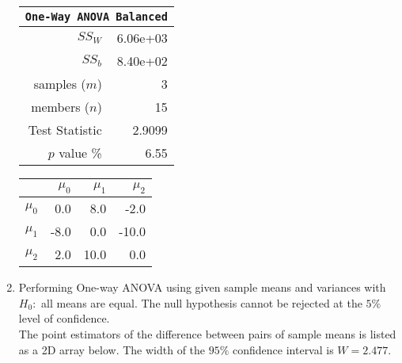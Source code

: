 \begin{enumerate}
	\begin{table}[H]
		\centering
		\begin{minipage}{0.4\textwidth}
			\centering
			\begin{tabular}{@{}rr@{}}
				\toprule
				\multicolumn{2}{c}{\texttt{One-Way ANOVA Balanced}} \\
				\midrule
				$SS_W$         &               6.06e+03 \\
				$SS_b$         &               8.40e+02 \\
				samples ($m$)  &                      3 \\
				members ($n$)  &                     15 \\
				Test Statistic &                 2.9099 \\
				$p$ value \%   &                   6.55 \\
				\bottomrule
			\end{tabular}
		\end{minipage}
		\begin{minipage}{0.4\textwidth}
			\centering
			\begin{tabular}{lrrr}
				\toprule
				{} &  $\mu_0$ &  $\mu_1$ &  $\mu_2$ \\
				\midrule
				$\mu_0$ &      0.0 &      8.0 &     -2.0 \\
				$\mu_1$ &     -8.0 &      0.0 &    -10.0 \\
				$\mu_2$ &      2.0 &     10.0 &      0.0 \\
				\bottomrule
			\end{tabular}
		\end{minipage}
	\end{table}
	\bigskip
	
	\item Performing One-way ANOVA using given sample means and variances with $ H_0 : $ all means are equal. The null hypothesis cannot be rejected at the $ 5\% $ level of confidence. \\
	
	The point estimators of the difference between pairs of sample means is listed as a 2D array below. The width of the $ 95\% $ confidence interval is $ W = 2.477 $.\\
	

\end{enumerate}
